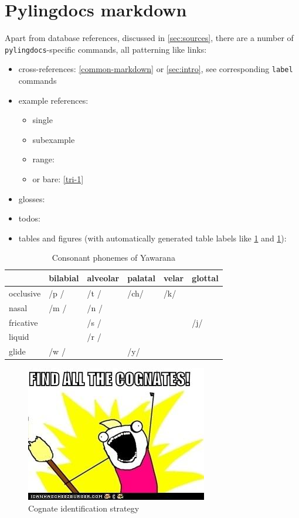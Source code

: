 \documentclass{article}
\begin{document}
\section{\texorpdfstring{Pylingdocs markdown
\label{pld-md}}{Pylingdocs markdown }}

Apart from database references, discussed in \cref{sec:sources}, there
are a number of \texttt{pylingdocs}-specific commands, all patterning
like links:

\begin{itemize}
\tightlist
\item
  cross-references: \cref{common-markdown} or \cref{sec:intro}, see
  corresponding \texttt{label} commands
\item
  example references:

  \begin{itemize}
  \tightlist
  \item
    single 
  \item
    subexample 
  \item
    range: 
  \item
    or bare: \ref{tri-1}
  \end{itemize}
\item
  glosses: 
\item
  todos:
\item
  tables and figures (with automatically generated table labels like
  \cref{tab:consonants} and \cref{fig:cognates}):
\end{itemize}

\begin{table}
\caption{Consonant phonemes of Yawarana}
\label{tab:consonants}
\centering
\begin{tabular}{llllll}
\toprule
 & bilabial & alveolar & palatal & velar & glottal \\
\midrule
occlusive & /p / & /t / & /ch/ & /k/ &  \\
nasal & /m / & /n / &  &  &  \\
fricative &  & /s / &  &  & /j/ \\
liquid &  & /r / &  &  &  \\
glide & /w / &  & /y/ &  &  \\
\bottomrule
\end{tabular}

\end{table}

\begin{figure}
\centering
\includegraphics{figures/cognates.jpg}
\caption{Cognate identification strategy\label{fig:cognates}}
\end{figure}
\end{document}
